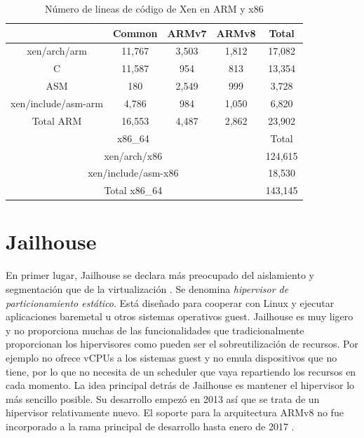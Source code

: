 \begin{table}[ht]

	\label{table:results45}
  \centering

	\begin{tabular}{ |c|c|c|c|c| }
		\hline
     & Common & ARMv7 & ARMv8 & Total\\
    \hline
    xen/arch/arm          & 11,767      & 3,503  & 1,812   & 17,082 \\
    \hline
    C                     & 11,587      & 954    & 813	    & 13,354 \\
    \hline
    ASM                   & 180         & 2,549  & 999     & 3,728  \\
    \hline
    xen/include/asm-arm   & 4,786       & 984    & 1,050   & 6,820  \\
    \hline
    Total ARM	            & 16,553  & 4,487  & 2,862        & 23,902 \\
    \hline
    \multicolumn{4}{|c|}{x86\_64}                           & Total\\
    \hline
    \multicolumn{4}{|c|}{xen/arch/x86}                      & 124,615\\
    \hline
    \multicolumn{4}{|c|}{xen/include/asm-x86}               & 18,530 \\
    \hline
    \multicolumn{4}{|c|}{Total x86\_64}                     & 143,145\\
    \hline
	\end{tabular}
	\caption{Número de lineas de código de Xen en ARM y x86 \cite{xen_arm_whitepaper}}

\end{table}

\section{Jailhouse} \label{jailhouse_sota}

En primer lugar, Jailhouse se declara más preocupado del aislamiento y segmentación que de la virtualización \cite{jailhouse_p1}. Se denomina \textit{hipervisor de particionamiento estático}. Está diseñado para cooperar con Linux y ejecutar aplicaciones baremetal u otros sistemas operativos guest. Jailhouse es muy ligero y no proporciona muchas de las funcionalidades que tradicionalmente proporcionan los hipervisores como pueden ser el sobreutilización de recursos. Por ejemplo no ofrece vCPUs a los sistemas guest y no emula dispositivos que no tiene, por lo que no necesita de un scheduler que vaya repartiendo los recursos en cada momento. La idea principal detrás de Jailhouse es mantener el hipervisor lo más sencillo posible. Su desarrollo empezó en 2013 así que se trata de un hipervisor relativamente nuevo. El soporte para la arquitectura ARMv8 no fue incorporado a la rama principal de desarrollo hasta enero de 2017 \cite{jailhouse_elc2017}.\\

